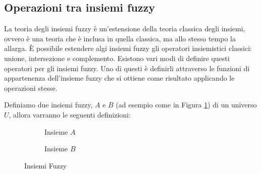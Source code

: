 \documentclass[a4paper,12pt]{report}
\begin{document}
\subsection*{Operazioni tra insiemi fuzzy}
La teoria degli insiemi fuzzy è un'estensione della teoria classica degli insiemi, ovvero è una teoria che è inclusa in quella classica, ma allo stesso tempo la allarga.
\`E possibile estendere algi insiemi fuzzy gli operatori insiemistici classici: unione, intersezione e complemento. Esistono vari modi di definire questi operatori per gli insiemi fuzzy. Uno di questi è definirli attraverso le funzioni di appartenenza dell'insieme fuzzy che si ottiene come risultato applicando le operazioni stesse.

\bigskip
Definiamo due insiemi fuzzy, $A$ e $B$ (ad esempio come in Figura \ref{fig:Insiemi Fuzzy}) di un universo $U$, allora varranno le seguenti definizioni:

\begin{figure}[h]
    \begin{subfigure}[t]{0.47\textwidth}
        \centering
        \caption{Insieme $A$}
    \end{subfigure}
    \begin{subfigure}[t]{0.47\textwidth}
        \centering
        \caption{Insieme $B$}
    \end{subfigure}
    \caption{Insiemi Fuzzy}
    \label{fig:Insiemi Fuzzy}
\end{figure}
\end{document}
